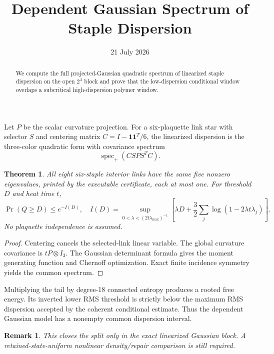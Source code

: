 \documentclass[11pt]{article}\usepackage[margin=1in]{geometry}\usepackage{amsmath,amsthm}\newtheorem{theorem}{Theorem}\newtheorem{remark}{Remark}
\title{Dependent Gaussian Spectrum of Staple Dispersion}\author{}\date{21 July 2026}
\begin{document}
\maketitle
\begin{abstract}We compute the full projected-Gaussian quadratic spectrum of linearized staple dispersion on the open $2^4$ block and prove that the low-dispersion conditional window overlaps a subcritical high-dispersion polymer window.\end{abstract}
Let $P$ be the scalar curvature projection. For a six-plaquette link star with selector $S$ and centering matrix $C=I-\mathbf1\mathbf1^T/6$, the linearized dispersion is the three-color quadratic form with covariance spectrum
\[\operatorname{spec}_+(C S P S^T C).
\]
\begin{theorem}All eight six-staple interior links have the same five nonzero eigenvalues, printed by the executable certificate, each at most one. For threshold $D$ and heat time $t$,
\[\Pr(Q\ge D)\le e^{-I(D)},\quad I(D)=\sup_{0<\lambda<(2t\lambda_{\max})^{-1}}\left[\lambda D+\frac32\sum_j\log(1-2\lambda t\lambda_j)\right].\]
No plaquette independence is assumed.\end{theorem}
\begin{proof}Centering cancels the selected-link linear variable. The global curvature covariance is $tP\otimes I_3$. The Gaussian determinant formula gives the moment generating function and Chernoff optimization. Exact finite incidence symmetry yields the common spectrum.\end{proof}
Multiplying the tail by degree-18 connected entropy produces a rooted free energy. Its inverted lower RMS threshold is strictly below the maximum RMS dispersion accepted by the coherent conditional estimate. Thus the dependent Gaussian model has a nonempty common dispersion interval.
\begin{remark}This closes the split only in the exact linearized Gaussian block. A retained-state-uniform nonlinear density/repair comparison is still required.\end{remark}
\end{document}
